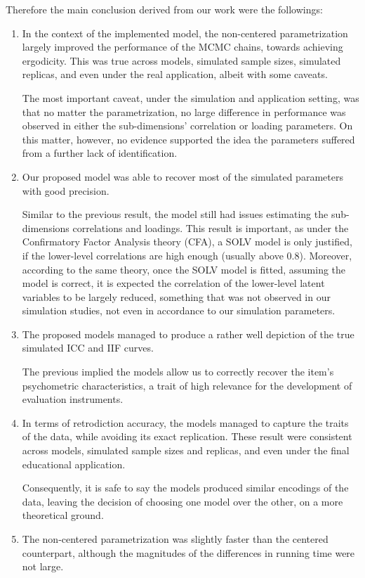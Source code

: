 \noindent Therefore the main conclusion derived from our work were the followings:
%
\begin{enumerate}
	\item In the context of the implemented model, the non-centered parametrization largely improved the performance of the MCMC chains, towards achieving ergodicity. This was true across models, simulated sample sizes, simulated replicas, and even under the real application, albeit with some caveats. 

	The most important caveat, under the simulation and application setting, was that no matter the parametrization, no large difference in performance was observed in either the sub-dimensions' correlation or loading parameters. On this matter, however, no evidence supported the idea the parameters suffered from a further lack of identification.
	\item Our proposed model was able to recover most of the simulated parameters with good precision.
	
	Similar to the previous result, the model still had issues estimating the sub-dimensions correlations and loadings. This result is important, as under the Confirmatory Factor Analysis theory (CFA), a SOLV model is only justified, if the lower-level correlations are high enough (usually above $0.8$). Moreover, according to the same theory, once the SOLV model is fitted, assuming the model is correct, it is expected the correlation of the lower-level latent variables to be largely reduced, something that was not observed in our simulation studies, not even in accordance to our simulation parameters.
	\item The proposed models managed to produce a rather well depiction of the true simulated ICC and IIF curves. 
	
	The previous implied the models allow us to correctly recover the item's psychometric characteristics, a trait of high relevance for the development of evaluation instruments.
	\item In terms of retrodiction accuracy, the models managed to capture the traits of the data, while avoiding its exact replication. These result were consistent across models, simulated sample sizes and replicas, and even under the final educational application. 
	
	Consequently, it is safe to say the models produced similar encodings of the data, leaving the decision of choosing one model over the other, on a more theoretical ground.
	\item The non-centered parametrization was slightly faster than the centered counterpart, although the magnitudes of the differences in running time were not large. 
	

\end{enumerate}
